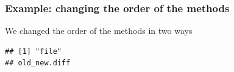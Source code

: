 \documentclass[
]{article}
\begin{document}
\normalsize

\newpage

\begin{landscape}

\subsubsection{Example: changing the order of the methods} \label{example_editing_line}

We changed the order of the methods in two ways

\small

\begin{verbatim}
## [1] "file"
## old_new.diff
\end{verbatim}

\normalsize

\scriptsize


\end{landscape}
\end{document}

